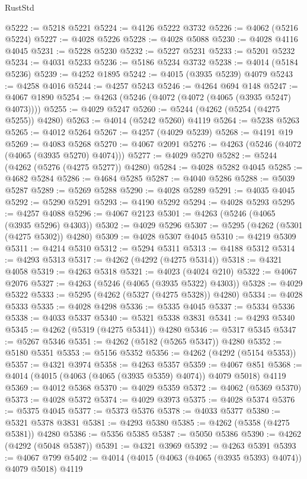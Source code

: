 \begin{lexlean}{RustStd}
\begin{coremodule}
@5222 := @5218 @5221
@5224 := @4126 @5222 @3732
@5226 := @4062 (@5216 @5224)
@5227 := @4028 @5226
@5228 := @4028 @5088
@5230 := @4028 @4116 @4045
@5231 := @5228 @5230
@5232 := @5227 @5231
@5233 := @5201 @5232
@5234 := @4031 @5233
@5236 := @5186 @5234 @3732
@5238 := @4014 (@5184 @5236)
@5239 := @4252 @1895
@5242 := @4015 (@3935 @5239) @4079
@5243 := @4258 @4016
@5244 := @4257 @5243
@5246 := @4264 @694 @148
@5247 := @4067 @1890
@5254 := @4263 (@5246 (@4072 (@4072 (@4065 (@3935 @5247) @4073))))
@5255 := @4029 @5247
@5260 := @5244 (@4262 (@5254 (@4275 @5255)) @4280)
@5263 := @4014 (@5242 @5260) @4119
@5264 := @5238 @5263
@5265 := @4012 @5264
@5267 := @4257 (@4029 @5239)
@5268 := @4191 @19
@5269 := @4083 @5268
@5270 := @4067 @2091
@5276 := @4263 (@5246 (@4072 (@4065 (@3935 @5270) @4074)))
@5277 := @4029 @5270
@5282 := @5244 (@4262 (@5276 (@4275 @5277)) @4280)
@5284 := @4028 @5282 @4045
@5285 := @4682 @5284
@5286 := @4684 @5285
@5287 := @4040 @5286
@5288 := @5039 @5287
@5289 := @5269 @5288
@5290 := @4028 @5289
@5291 := @4035 @4045
@5292 := @5290 @5291
@5293 := @4190 @5292
@5294 := @4028 @5293
@5295 := @4257 @4088
@5296 := @4067 @2123
@5301 := @4263 (@5246 (@4065 (@3935 @5296) @4303))
@5302 := @4029 @5296
@5307 := @5295 (@4262 (@5301 (@4275 @5302)) @4280)
@5309 := @4028 @5307 @4045
@5310 := @4219 @5309
@5311 := @4214 @5310
@5312 := @5294 @5311
@5313 := @4188 @5312
@5314 := @4293 @5313
@5317 := @4262 (@4292 (@4275 @5314))
@5318 := @4321 @4058
@5319 := @4263 @5318
@5321 := @4023 (@4024 @210)
@5322 := @4067 @2076
@5327 := @4263 (@5246 (@4065 (@3935 @5322) @4303))
@5328 := @4029 @5322
@5333 := @5295 (@4262 (@5327 (@4275 @5328)) @4280)
@5334 := @4028 @5333
@5335 := @4028 @4298
@5336 := @5335 @4045
@5337 := @5334 @5336
@5338 := @4033 @5337
@5340 := @5321 @5338 @3831
@5341 := @4293 @5340
@5345 := @4262 (@5319 (@4275 @5341)) @4280
@5346 := @5317 @5345
@5347 := @5267 @5346
@5351 := @4262 (@5182 (@5265 @5347)) @4280
@5352 := @5180 @5351
@5353 := @5156 @5352
@5356 := @4262 (@4292 (@5154 @5353))
@5357 := @4321 @3974
@5358 := @4263 @5357
@5359 := @4067 @851
@5368 := @4014 (@4015 (@4063 (@4065 (@3935 @5359) @4074)) @4079 @5018) @4119
@5369 := @4012 @5368
@5370 := @4029 @5359
@5372 := @4062 (@5369 @5370)
@5373 := @4028 @5372
@5374 := @4029 @3973
@5375 := @4028 @5374
@5376 := @5375 @4045
@5377 := @5373 @5376
@5378 := @4033 @5377
@5380 := @5321 @5378 @3831
@5381 := @4293 @5380
@5385 := @4262 (@5358 (@4275 @5381)) @4280
@5386 := @5356 @5385
@5387 := @5050 @5386
@5390 := @4262 (@4292 (@5048 @5387))
@5391 := @4321 @3969
@5392 := @4263 @5391
@5393 := @4067 @799
@5402 := @4014 (@4015 (@4063 (@4065 (@3935 @5393) @4074)) @4079 @5018) @4119

\end{coremodule}
\end{lexlean}
